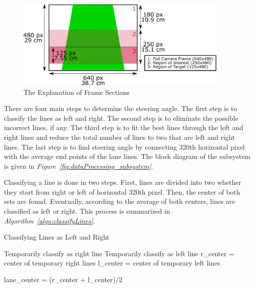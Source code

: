 \documentclass[a4paper,12pt]{article}
\begin{document}
\begin{enumerate}
		
			\begin{figure}[H]
				\centering
				\includegraphics[width=0.93\textwidth]{images/camera_vision_explained}
				\caption{The Explanation of Frame Sections}\label{fig:camera_vision_explained}
			\end{figure}	
					
			There are four main steps to determine the steering angle.  The first step is to classify the lines as left and right. The second step is to eliminate the possible incorrect lines, if any. The third step is to fit the best lines through the left and right lines and reduce the total number of lines to two that are left and right lines. The last step is to find steering angle by connecting 320th horizontal pixel with the average end points of the lane lines. The block diagram of the subsystem is given in \textit{Figure~\ref{fig:dataProcessing_subsystem}}.
			
			
			Classifying a line is done in two steps. First, lines are divided into two whether they start from right or left of horizontal 320th pixel. Then, the center of both sets are found. Eventually, according to the average of both centers, lines are classified as left or right. This process is summarized in \textit{Algorithm~\ref{algo:classifyLines}}.
			
			
			\begin{algorithm}[b!]
				\caption{Classifying Lines as Left and Right}
				\label{algo:classifyLines}
				\DontPrintSemicolon
				
				{ 
					{
						Temporarily classify as right line 
					}
					\Else
					{
						Temporarily classify as left line 
					}
				}
				r\_center = center of temporary right lines \;
				l\_center = center of temporary left lines \;
				
				lane\_center = (r\_center + l\_center)/2 \;
				

\end{algorithm}
\end{enumerate}
\end{document}
